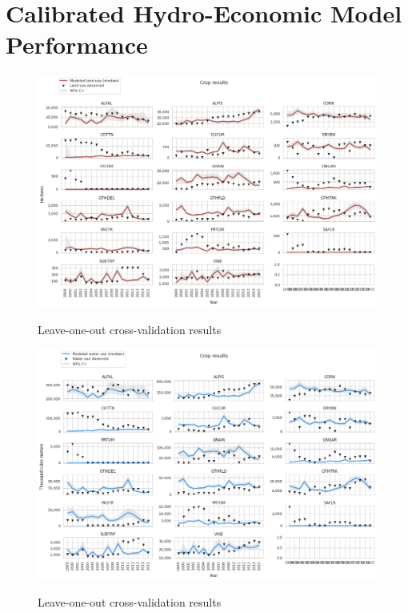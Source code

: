 \documentclass[11pt,a4paper]{article}
\begin{document}
\section{Calibrated Hydro-Economic Model Performance}

\begin{figure}[H]
\centering
\includegraphics[width=1\textwidth]{land_use.png}
\label{fig:mesh1}
\caption{Leave-one-out cross-validation results}
\end{figure}

\begin{figure}[H]
\centering
\includegraphics[width=1\textwidth]{water_use.png}
\label{fig:mesh1}
\caption{Leave-one-out cross-validation results}
\end{figure}
\end{document}
